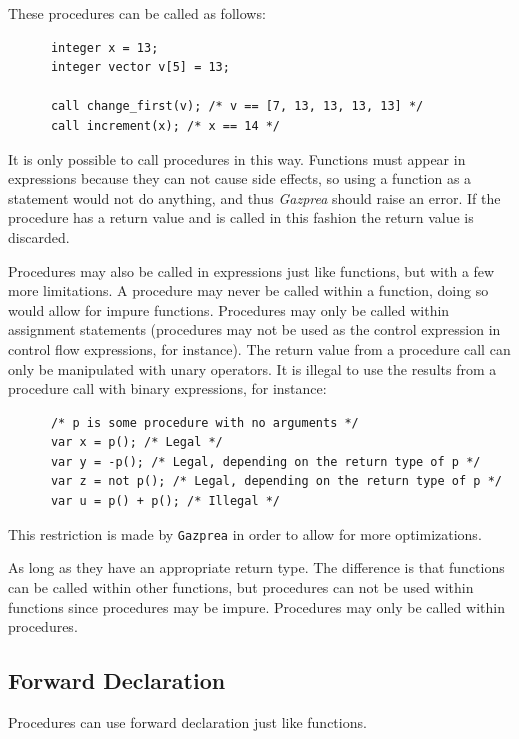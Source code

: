 \documentclass{article}
\begin{document}
    These procedures can be called as follows:

    \begin{lstlisting}
      integer x = 13;
      integer vector v[5] = 13;

      call change_first(v); /* v == [7, 13, 13, 13, 13] */
      call increment(x); /* x == 14 */
    \end{lstlisting}

    It is only possible to call procedures in this way. Functions must appear in expressions because they can not
    cause side effects, so using a function as a statement would not do anything, and thus \textit{Gazprea} should
    raise an error. If the procedure has a return value and is called in this fashion the return value is discarded.

    Procedures may also be called in expressions just like functions, but with a few more limitations. A procedure
    may never be called within a function, doing so would allow for impure functions. Procedures may only be called
    within assignment statements (procedures may not be used as the control expression in control flow expressions,
    for instance). The return value from a procedure call can only be manipulated with unary operators. It is
    illegal to use the results from a procedure call with binary expressions, for instance:

    \begin{lstlisting}
      /* p is some procedure with no arguments */
      var x = p(); /* Legal */
      var y = -p(); /* Legal, depending on the return type of p */
      var z = not p(); /* Legal, depending on the return type of p */
      var u = p() + p(); /* Illegal */
    \end{lstlisting}

    This restriction is made by \texttt{Gazprea} in order to allow for more optimizations.

    As long as they have an appropriate return type. The difference is that functions can be called within other
    functions, but procedures can not be used within functions since procedures may be impure. Procedures may only
    be called within procedures.


\subsection{Forward Declaration}

  Procedures can use forward declaration just like functions.
\end{document}
